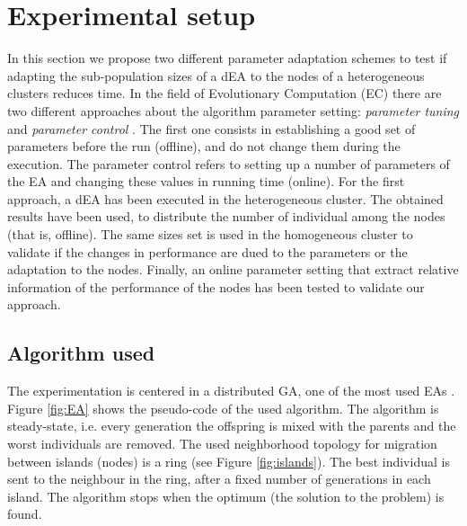 \documentclass[final,1p,times]{elsarticle}
\begin{document}
\section{Experimental setup}
\label{sec:experiments}
In this section we propose two different parameter adaptation schemes to test if adapting the sub-population sizes of a dEA to the nodes of a  heterogeneous clusters reduces time. In the field of  Evolutionary Computation (EC) there are two different approaches about the algorithm parameter setting: {\em parameter tuning} and {\em parameter control} \cite{PARAMETERTUNING}. The first one consists in establishing a good set of parameters before the run (offline), and do not change them during the execution. The parameter control refers to setting up a number of parameters of the EA  and changing these values in running time (online). For the first approach, a dEA has been executed in the heterogeneous cluster. The obtained results have been used, to distribute the number of individual among the nodes (that is, offline). The same sizes set is used in the homogeneous cluster to validate if the changes in performance are dued to the parameters or the adaptation to the nodes. Finally, an online parameter setting that extract relative information of the performance of the nodes has been tested to validate our approach.




\subsection{Algorithm used}
The experimentation is centered in a distributed GA, one of the most used EAs \cite{GeneticAlgorithmsEiben03}. Figure \ref{fig:EA} shows the pseudo-code of the used algorithm.
The algorithm is steady-state, i.e. every generation the offspring is mixed with the parents and the worst individuals are removed. The used neighborhood topology for migration between islands (nodes) is a ring (see Figure \ref{fig:islands}). The best individual is sent to the neighbour in the ring, after a fixed number of generations in each island. The algorithm stops when the optimum (the solution to the problem) is found.  

\end{document}
